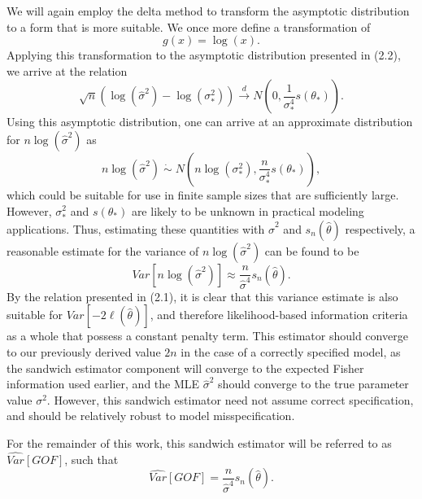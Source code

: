 \documentclass[12pt]{article} %
\theoremstyle{definition}
\begin{document}
		We will again employ the delta method to transform the asymptotic distribution to a form that is more suitable. We once more define a transformation of
		\begin{equation*}
			g(x) = \log(x) .
		\end{equation*}
		Applying this transformation to the asymptotic distribution presented in (2.2), we arrive at the relation
		\begin{equation*}
			\sqrt{n} ( \log (\hat{\sigma}^2) - \log(\sigma_*^2)) \xrightarrow[]{d} N \left( 0, \frac{1}{\sigma_*^4} s(\theta_*) \right) .
		\end{equation*}
		Using this asymptotic distribution, one can arrive at an approximate distribution for $n\log(\hat{\sigma}^2)$ as
		\begin{equation*}
			n\log(\hat{\sigma}^2) \; \dot\sim \; N \left( n\log(\sigma_* ^2), \frac{n}{\sigma_*^4} s(\theta_*) \right) ,
		\end{equation*}
		which could be suitable for use in finite sample sizes that are sufficiently large. However, $\sigma_*^2$ and $s(\theta_*)$ are likely to be unknown in practical modeling
		applications. Thus, estimating these quantities with $\hat{\sigma}^2$ and $s_n(\hat{\theta})$ respectively, a reasonable estimate for the variance of $n\log(\hat{\sigma}^2)$ can
		be found to be
		\begin{equation*}
			Var \left[ n\log(\hat{\sigma}^2) \right] \approx \frac{n}{\hat{\sigma}^4} s_n(\hat{\theta}) .
		\end{equation*}
		By the relation presented in (2.1), it is clear that this variance estimate is also suitable for $Var \left[ -2 \ell (\hat{\theta}  ) \right]$, and therefore
		likelihood-based information criteria as a whole that possess a constant penalty term. This estimator should converge to our previously derived value $2n$ in the case of a correctly
		specified model, as the sandwich estimator component will converge to the expected Fisher information used earlier, and the MLE $\hat{\sigma}^2$ should converge to the true
		parameter value $\sigma^2$. However, this sandwich estimator need not assume correct specification, and should be relatively robust to model misspecification.
		
		For the remainder of this work, this sandwich estimator will be referred to as $\widehat{Var}[GOF]$, such that
		\begin{equation*}
			\widehat{Var}[GOF] = \frac{n}{\hat{\sigma}^4} s_n(\hat{\theta}) .
		\end{equation*}
\end{document}
